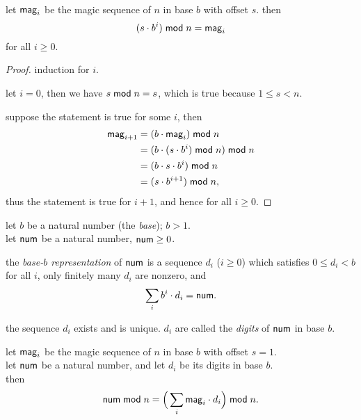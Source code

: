\documentclass[a4paper, 12pt]{report}
\begin{document}
\newpage

\begin{lemma}
	let $\mathsf{mag}_i$ be the magic sequence of $n$ in base $b$ with offset $s$. then
	\begin{equation*}
		(s \cdot b^i) \;\mathsf{mod}\; n = \mathsf{mag}_i
	\end{equation*}
	for all $i \geq 0$.
\end{lemma}

\begin{proof}
	induction for $i$.

	let $i = 0$, then we have $s \;\mathsf{mod}\; n = s$, which is true because $1 \leq s < n$. \smallskip

	suppose the statement is true for some $i$, then
	\begin{align*}
		    \mathsf{mag}_{i + 1}
		& = (b \cdot \mathsf{mag}_i) \;\mathsf{mod}\; n \\
		& = (b \cdot (s \cdot b^i) \;\mathsf{mod}\; n) \;\mathsf{mod}\; n \\
		& = (b \cdot s \cdot b^i) \;\mathsf{mod}\; n \\
		& = (s \cdot b^{i + 1}) \;\mathsf{mod}\; n,
	\end{align*}
	thus the statement is true for $i + 1$, and hence for all $i \geq 0$.
\end{proof}

\begin{definition}
	let $b$ be a natural number (the \emph{base}); $b > 1$. \\
	let $\mathsf{num}$ be a natural number, $\mathsf{num} \geq 0$. \medskip

	the \emph{base-$b$ representation} of $\mathsf{num}$ is a sequence $d_i$ ($i \geq 0$) which satisfies $0 \leq d_i < b$ for all $i$, only finitely many $d_i$ are nonzero, and
	\begin{equation*}
		\sum_i b^i \cdot d_i = \mathsf{num}.
	\end{equation*}

	the sequence $d_i$ exists and is unique. $d_i$ are called the \emph{digits} of $\mathsf{num}$ in base $b$.
\end{definition}

\begin{theorem}
	let $\mathsf{mag}_i$ be the magic sequence of $n$ in base $b$ with offset $s = 1$. \\
	let $\mathsf{num}$ be a natural number, and let $d_i$ be its digits in base $b$. \\
	then
	\begin{equation*}
		\mathsf{num} \;\mathsf{mod}\; n = \Big( \sum_i \mathsf{mag}_i \cdot d_i \Big) \;\mathsf{mod}\; n.
	\end{equation*}
\end{theorem}
\end{document}
